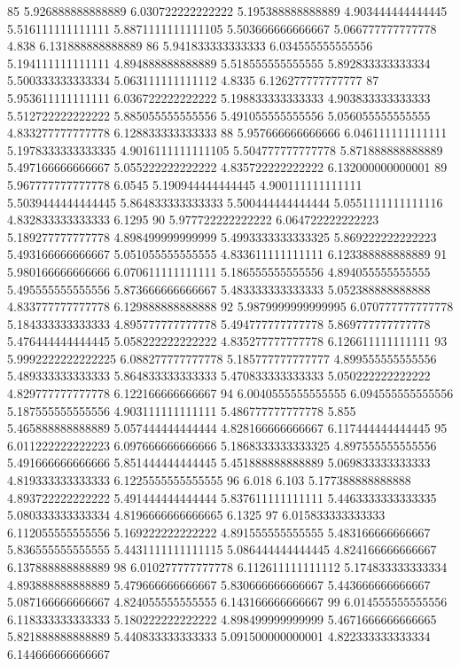85 5.926888888888889 6.030722222222222 5.195388888888889 4.903444444444445 5.516111111111111 5.8871111111111105 5.503666666666667 5.066777777777778 4.838 6.131888888888889
86 5.941833333333333 6.034555555555556 5.194111111111111 4.894888888888889 5.518555555555555 5.892833333333334 5.500333333333334 5.063111111111112 4.8335 6.126277777777777
87 5.953611111111111 6.036722222222222 5.198833333333333 4.903833333333333 5.512722222222222 5.885055555555556 5.491055555555556 5.056055555555555 4.833277777777778 6.128833333333333
88 5.957666666666666 6.046111111111111 5.1978333333333335 4.9016111111111105 5.504777777777778 5.871888888888889 5.497166666666667 5.055222222222222 4.835722222222222 6.132000000000001
89 5.967777777777778 6.0545 5.190944444444445 4.900111111111111 5.5039444444444445 5.864833333333333 5.500444444444444 5.0551111111111116 4.832833333333333 6.1295
90 5.977722222222222 6.064722222222223 5.189277777777778 4.898499999999999 5.4993333333333325 5.869222222222223 5.493166666666667 5.051055555555555 4.833611111111111 6.123388888888889
91 5.980166666666666 6.070611111111111 5.186555555555556 4.894055555555555 5.495555555555556 5.873666666666667 5.483333333333333 5.052388888888888 4.833777777777778 6.129888888888888
92 5.9879999999999995 6.070777777777778 5.184333333333333 4.895777777777778 5.494777777777778 5.869777777777778 5.476444444444445 5.058222222222222 4.835277777777778 6.126611111111111
93 5.9992222222222225 6.088277777777778 5.185777777777777 4.899555555555556 5.489333333333333 5.864833333333333 5.470833333333333 5.050222222222222 4.829777777777778 6.122166666666667
94 6.0040555555555555 6.094555555555556 5.187555555555556 4.903111111111111 5.486777777777778 5.855 5.465888888888889 5.057444444444444 4.828166666666667 6.117444444444445
95 6.011222222222223 6.097666666666666 5.1868333333333325 4.897555555555556 5.491666666666666 5.851444444444445 5.451888888888889 5.069833333333333 4.819333333333333 6.1225555555555555
96 6.018 6.103 5.177388888888888 4.893722222222222 5.491444444444444 5.837611111111111 5.4463333333333335 5.080333333333334 4.8196666666666665 6.1325
97 6.015833333333333 6.112055555555556 5.169222222222222 4.891555555555555 5.483166666666667 5.836555555555555 5.4431111111111115 5.086444444444445 4.824166666666667 6.137888888888889
98 6.010277777777778 6.112611111111112 5.174833333333334 4.893888888888889 5.479666666666667 5.830666666666667 5.443666666666667 5.087166666666667 4.824055555555555 6.143166666666667
99 6.014555555555556 6.118333333333333 5.180222222222222 4.898499999999999 5.4671666666666665 5.821888888888889 5.440833333333333 5.091500000000001 4.822333333333334 6.144666666666667
